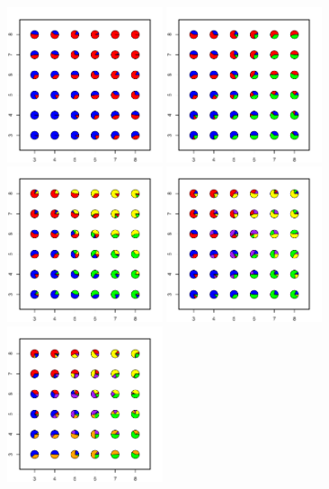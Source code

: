 \documentclass[12pt]{article}
\begin{document}
\begin{figure}
	\centering
			{\includegraphics[width=1.8in,height=1.8in]{figs/sims/simK1_nsp_pies_K2.pdf}}
			{\includegraphics[width=1.8in,height=1.8in]{figs/sims/simK1_nsp_pies_K3.pdf}}
			{\includegraphics[width=1.8in,height=1.8in]{figs/sims/simK1_nsp_pies_K4.pdf}}
			{\includegraphics[width=1.8in,height=1.8in]{figs/sims/simK1_nsp_pies_K5.pdf}}
			{\includegraphics[width=1.8in,height=1.8in]{figs/sims/simK1_nsp_pies_K6.pdf}}

\end{figure}
\end{document}
